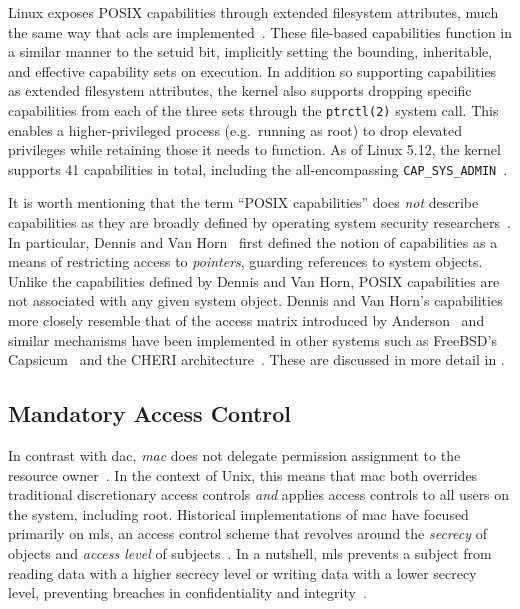 \documentclass[
  fontsize=12pt,
  titlepage=firstiscover,
  paper=letter,
oneside,
  cleardoublepage=plain,
  parskip=half-,
  DIV=10,
  parindent,
  appendixprefix,
  chapterprefix,
  listof=totoc,
]{scrbook}
\begin{document}
Linux exposes POSIX capabilities through extended filesystem attributes, much the same way
that \glspl{acl} are implemented~\cite{corbet2006_capabities_b}. These file-based
capabilities function in a similar manner to the setuid bit, implicitly setting the
bounding, inheritable, and effective capability sets on execution. In addition so
supporting capabilities as extended filesystem attributes, the kernel also supports
dropping specific capabilities from each of the three sets through the \texttt{ptrctl(2)}
system call. This enables a higher-privileged process (e.g.\ running as root) to drop
elevated privileges while retaining those it needs to function. As of Linux 5.12, the
kernel supports 41 capabilities in total, including the all-encompassing
\texttt{CAP\_SYS\_ADMIN}~\cite{linux_capability_h}.

It is worth mentioning that the term \enquote{POSIX capabilities} does \textit{not}
describe capabilities as they are broadly defined by operating system security
researchers~\cite{anderson2017_comparison}. In particular, Dennis and Van
Horn~\cite{dennis1966_semantics} first defined the notion of capabilities as a means of
restricting access to \textit{pointers}, guarding references to system objects. Unlike the
capabilities defined by Dennis and Van Horn, POSIX capabilities are not associated with
any given system object. Dennis and Van Horn's capabilities more closely resemble that of
the access matrix introduced by Anderson~\cite{anderson1972_report} and similar mechanisms
have been implemented in other systems such as FreeBSD's
Capsicum~\cite{watson2010_capsicum} and the CHERI architecture~\cite{watson2015_cheri,
davis2019_cheriabi}. These are discussed in more detail in .

\subsection{Mandatory Access Control}\label{ss:mac}

In contrast with \gls{dac}, \textit{\gls{mac}} does not delegate permission assignment to
the resource owner~\cite{spencer1999_flask, van_oorschot2020_tools_jewels,
jaeger2008_os_security}. In the context of Unix, this means that \gls{mac} both overrides
traditional discretionary access controls \textit{and} applies access controls to all
users on the system, including root. Historical implementations of \gls{mac} have focused
primarily on \gls{mls}, an access control scheme that revolves around the \textit{secrecy}
of objects and \textit{access level} of subjects~\cite{bell2005_blp}. In a nutshell,
\gls{mls} prevents a subject from reading data with a higher secrecy level or writing data
with a lower secrecy level, preventing breaches in confidentiality and
integrity~\cite{jaeger2008_os_security}.
\end{document}
